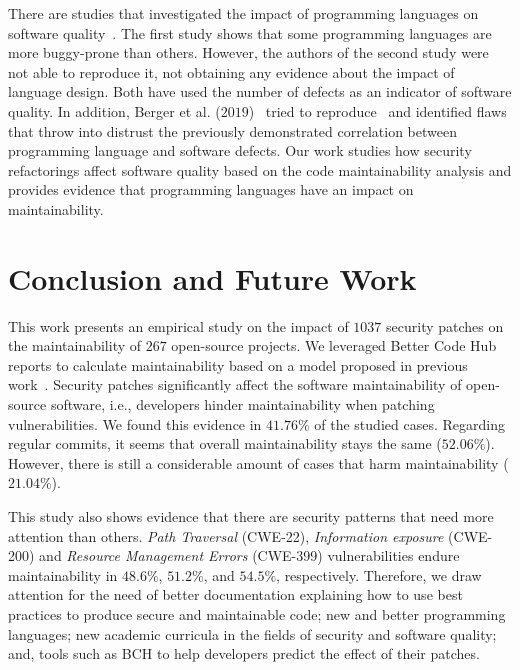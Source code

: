 \documentclass[10pt,conference]{IEEEtran}
\begin{document}
There are studies that investigated the impact of programming languages on software
quality~\cite{Ray:2014:LSS:2635868.2635922,Ray:2017:LSP:3144574.3126905}. The first
study shows that some programming languages are more buggy-prone than others. However,
the authors of the second study were not able to reproduce it, not obtaining any
evidence about the impact of language design. Both have used the number of
defects as an indicator of software quality. In addition,
Berger et al. ($2019$)~\cite{2019arXiv190110220B} tried to reproduce~\cite{Ray:2014:LSS:2635868.2635922,
Ray:2017:LSP:3144574.3126905} and identified flaws that throw into distrust the previously demonstrated
correlation between programming language and software defects. Our work studies how
security refactorings affect software quality based on the code maintainability
analysis and provides evidence that programming languages have an impact on
maintainability.

\section{Conclusion and Future Work}\label{sec:conclusions}

This work presents an empirical study on the impact of $1037$ security
patches on the maintainability of $267$ open-source projects. We leveraged
Better Code Hub reports to calculate maintainability based on a model proposed in previous work~\cite{Olivari:2018}. Security patches 
significantly affect the software maintainability of open-source software, i.e., 
developers hinder maintainability when patching vulnerabilities. We found this evidence in
$41.76\%$ of the studied cases. Regarding regular commits, it seems that overall
maintainability stays the same ($52.06\%$). However, there is still a 
considerable amount of cases that harm maintainability ($21.04\%$).

This study also shows evidence that there are security patterns that need more
attention than others. \emph{Path Traversal} (CWE-22),
\emph{Information exposure} (CWE-200) and \emph{Resource Management Errors} (CWE-399) vulnerabilities endure maintainability
in $48.6\%$, $51.2\%$, and $54.5\%$, respectively. Therefore, we draw attention
for the need of better documentation explaining how to use best practices to
produce secure and maintainable code; new and better programming languages; new
academic curricula in the fields of security and software quality; and, tools
such as BCH to help developers predict the effect of their patches.
\end{document}
